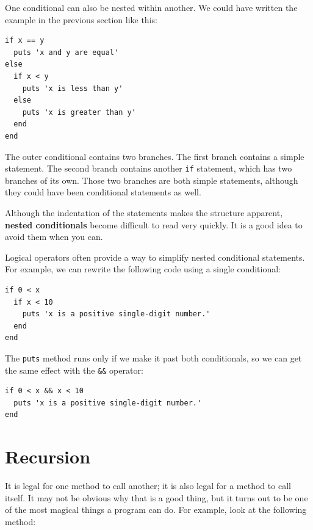 \documentclass[10pt]{book}
\begin{document}
One conditional can also be nested within another.  We could have
written the example in the previous section like this:

\begin{verbatim}
if x == y
  puts 'x and y are equal'
else
  if x < y
    puts 'x is less than y'
  else
    puts 'x is greater than y'
  end
end
\end{verbatim}
%
The outer conditional contains two branches.  The
first branch contains a simple statement.  The second branch
contains another {\tt if} statement, which has two branches of its
own.  Those two branches are both simple statements,
although they could have been conditional statements as well.

Although the indentation of the statements makes the structure
apparent, {\bf nested conditionals} become difficult to read very
quickly.  It is a good idea to avoid them when you can.

Logical operators often provide a way to simplify nested conditional
statements.  For example, we can rewrite the following code using a
single conditional:

\begin{verbatim}
if 0 < x
  if x < 10
    puts 'x is a positive single-digit number.'
  end
end
\end{verbatim}
%
The {\tt puts} method runs only if we make it past both
conditionals, so we can get the same effect with the {\tt \&\&} operator:

\begin{verbatim}
if 0 < x && x < 10
  puts 'x is a positive single-digit number.'
end
\end{verbatim}





\section{Recursion}
\label{recursion}

It is legal for one method to call another;
it is also legal for a method to call itself.  It may not be obvious
why that is a good thing, but it turns out to be one of the most
magical things a program can do.
For example, look at the following method:
\end{document}
